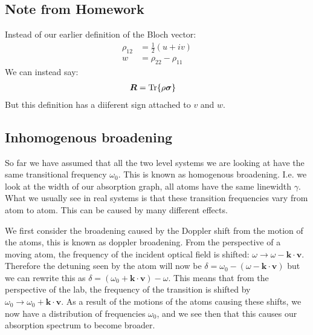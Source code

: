 \subsection*{Note from Homework}
Instead of our earlier definition of the Bloch vector:
\begin{align*}
	\rho_{12} &= \frac{1}{2}(u + iv) \\
	w &= \rho_{22} - \rho_{11}
\end{align*}
We can instead say:
\begin{align*}
	\bm{R} &= \Tr{\rho\bm{\sigma}}
\end{align*}
But this definition has a diiferent sign attached to $v$ and $w$.
\subsection{Inhomogenous broadening}
So far we have assumed that all the two level systems we are looking at have the same transitional frequency $\omega_0$. This is known as homogenous broadening. I.e. we look at the width of our absorption graph, all atoms have the same linewidth $\gamma$.
What we usually see in real systems is that these transition frequencies vary from atom to atom. This can be caused by many different effects.

We first consider the broadening caused by the Doppler shift from the motion of the atoms, this is known as doppler broadening. From the perspective of a moving atom, the frequency of the incident optical field is shifted: $\omega \to \omega - \bm{k}\cdot\bm{v}$.
Therefore the detuning seen by the atom will now be $\delta = \omega_0 - (\omega - \bm{k}\cdot\bm{v})$ but we can rewrite this as $\delta = (\omega_0 + \bm{k}\cdot\bm{v}) - \omega$.
This means that from the perspective of the lab, the frequency of the transition is shifted by $\omega_0 \to \omega_0 + \bm{k}\cdot\bm{v}$. As a result of the motions of the atoms causing these shifts, we now have a distribution of frequencies $\omega_0$,
and we see then that this causes our absorption spectrum to become broader.

